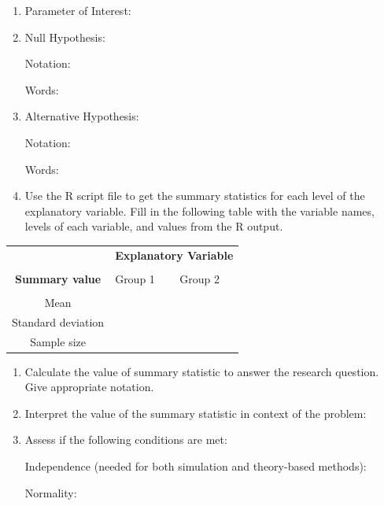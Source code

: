 \documentclass[
]{report}
\begin{document}
\begin{enumerate}
\def\labelenumi{\alph{enumi}.}
\item
  Parameter of Interest:
  \vspace{0.3in}
\item
  Null Hypothesis:

  Notation:
  \vspace{0.3in}

  Words:
  \vspace{0.5in}
\item
  Alternative Hypothesis:

  Notation:
  \vspace{0.3in}

  Words:
  \vspace{0.5in}
\item
  Use the R script file to get the summary statistics for each level of the explanatory variable. Fill in the following table with the variable names, levels of each variable, and values from the R output.
\end{enumerate}

\begingroup
\setlength{\tabcolsep}{14pt}
\renewcommand{\arraystretch}{2}
\begin{center}
\begin{tabular}{|c|p{1in}|p{1in}|}
\hline
 & \multicolumn{2}{|c|}{\textbf{Explanatory Variable}} \\
 & \multicolumn{2}{|c|}{ } \\ \hline
\textbf{Summary value} & Group 1 & Group 2 \\
 & & \\ \hline
 Mean & & \\ \hline
 Standard deviation & & \\ \hline
 Sample size & & \\ \hline
\end{tabular}
\end{center}
\endgroup

\begin{enumerate}
\def\labelenumi{\alph{enumi}.}
\setcounter{enumi}{4}
\item
  Calculate the value of summary statistic to answer the research question. Give appropriate notation.
  \vspace{0.3in}
\item
  Interpret the value of the summary statistic in context of the problem:
  \vspace{0.3in}
\item
  Assess if the following conditions are met:

  Independence (needed for both simulation and theory-based methods):
  \vspace{0.8in}

  Normality:
\end{enumerate}
\end{document}
